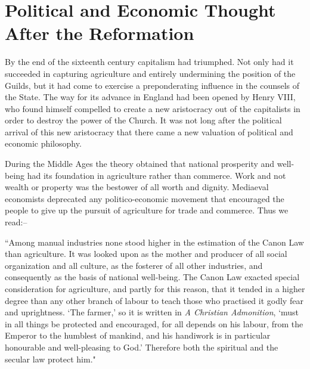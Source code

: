 \documentclass{book}
\begin{document}
\chapter{Political and Economic Thought After the Reformation}
\label{chapter-15}
By the end of the sixteenth century capitalism had triumphed. Not only had it succeeded in capturing agriculture and entirely undermining the position of the Guilds, but it had come to exercise a preponderating influence in the counsels of the State. The way for its advance in England had been opened by Henry VIII, who found himself compelled to create a new aristocracy out of the capitalists in order to destroy the power of the Church. It was not long after the political arrival of this new aristocracy that there came a new valuation of political and economic philosophy.

During the Middle Ages the theory obtained that national prosperity and well-being had its foundation in agriculture rather than commerce. Work and not wealth or property was the bestower of all worth and dignity. Mediaeval economists deprecated any politico-economic movement that encouraged the people to give up the pursuit of agriculture for trade and commerce. Thus we read:–

“Among manual industries none stood higher in the estimation of the Canon Law than agriculture. It was looked upon as the mother and producer of all social organization and all culture, as the fosterer of all other industries, and consequently as the basis of national well-being. The Canon Law exacted special consideration for agriculture, and partly for this reason, that it tended in a higher degree than any other branch of labour to teach those who practised it godly fear and uprightness. ‘The farmer,’ so it is written in \emph{A Christian Admonition}, ‘must in all things be protected and encouraged, for all depends on his labour, from the Emperor to the humblest of mankind, and his handiwork is in particular honourable and well-pleasing to God.’ Therefore both the spiritual and the secular law protect him."
\end{document}
